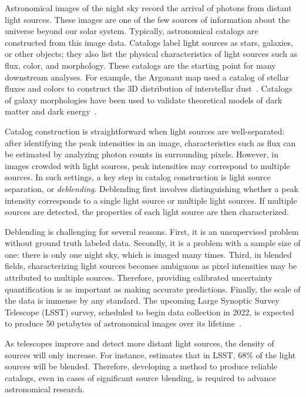 Astronomical images of the night sky record the arrival of photons from distant light sources. 
These images are one of the few sources of information about the universe beyond our solar system.
Typically, astronomical catalogs are constructed from this image data.
Catalogs label light sources as stars, galaxies, or other objects; 
they also list the physical characteristics of light sources such as flux, color, and morphology. 
These catalogs are the starting point for many downstream analyses.
For example, the Argonaut map used a catalog of stellar fluxes and colors to construct the 3D distribution of interstellar dust~\cite{Green_2019_argonaut}. 
Catalogs of galaxy morphologies have been used to validate theoretical models of dark matter and dark energy~\cite{Eisenstein_2005_darkmatter}. 

Catalog construction is straightforward when light sources are well-separated: after identifying the peak intensities in an image, characteristics such as flux can be estimated by analyzing photon counts in surrounding pixels. 
However, in images crowded with light sources, peak intensities may correspond to multiple sources.
In such settings, a key step in catalog construction is light source separation, or {\itshape deblending}. 
Deblending first involves distinguishing whether a peak intensity corresponds to a single light source or multiple light sources. 
If multiple sources are detected, the properties of each light source are then characterized. 

Deblending is challenging for several reasons.
First, it is an unsupervised problem without ground truth labeled data. 
Secondly, it is a problem with a sample size of one: there is only one night sky, which is imaged many times.
Third, in blended fields, characterizing light sources becomes ambiguous as pixel intensities may be attributed to multiple sources. Therefore, providing calibrated uncertainty quantification is as important as making accurate predictions.
Finally, the scale of the data is immense by any standard. The upcoming Large Synoptic Survey Telescope (LSST) survey, scheduled to begin data collection in 2022, is expected to produce 50 petabytes of astronomical images over its lifetime~\cite{LSST_about}.

As telescopes improve and detect more distant light sources, the density of sources will only increase. 
For instance, \cite{Bosch_2017_LSST} estimates that in LSST, 68\% of the light sources will be blended. Therefore, developing a method to produce reliable catalogs, even in cases of significant source blending, is required to advance astronomical research. 

